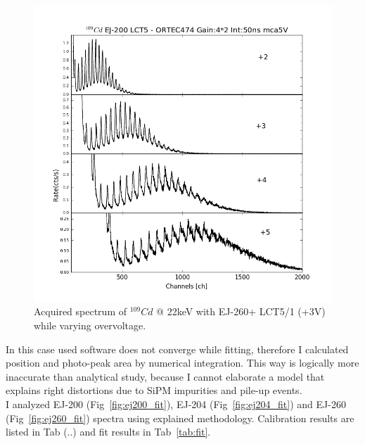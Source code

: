 \documentclass[10pt,a4paper, openany]{book}
\begin{document}
\begin{figure}[!h]
\begin{center}
\includegraphics[scale=0.7]{imm/conf.png}
\end{center}
\caption{Acquired spectrum of $^{109}Cd$ @ 22keV with EJ-260+ LCT5/1 (+3V) while varying overvoltage.} 
\label{fig:es_conf}
\end{figure}

In this case used software does not converge while fitting, therefore I calculated position and photo-peak area by numerical integration. This way is logically more inaccurate than analytical study, because I cannot elaborate a model that explains right distortions due to SiPM impurities and pile-up events.\\[2ex]

I analyzed EJ-200 (Fig~\ref{fig:ej200_fit}), EJ-204 (Fig~\ref{fig:ej204_fit}) and EJ-260 (Fig~\ref{fig:ej260_fit}) spectra using explained methodology. Calibration results are listed in Tab (..) and fit results in Tab~\ref{tab:fit}.
\end{document}
